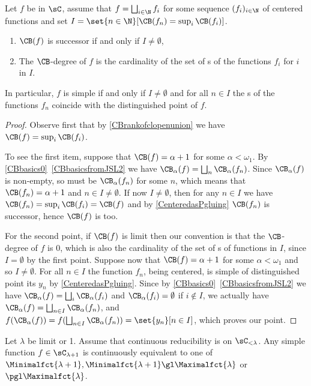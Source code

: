 \begin{proposition}\label{Simpleiffcoincidenceofcocenters}
Let $f$ be in $\sC$, assume that $f=\bigsqcup_{i\in\N} f_i$ for some sequence $(f_i)_{i\in\N}$ of centered functions and set $I=\set{n\in\N}[\CB(f_n)=\sup_i\CB(f_i)]$.
\begin{enumerate}
\item $\CB(f)$ is successor if and only if $I\neq\emptyset$,
\item The $\CB$-degree of $f$ is the cardinality of the set of \cocenter{}s of the functions $f_i$ for $i$ in $I$.
\end{enumerate}
In particular, $f$ is simple if and only if $I\neq\emptyset$ and for all $n\in I$ the \cocenter{}s of the functions $f_n$ coincide with the distinguished point of $f$.
\end{proposition}

\begin{proof}
Observe first that by \cref{CBrankofclopenunion} we have $\CB(f)=\sup_i\CB(f_i)$.

To see the first item, suppose that $\CB(f)=\alpha+1$ for some $\alpha<\omega_1$. By \cref{CBbasics0}~\cref{CBbasicsfromJSL2} we have $\CB_\alpha(f)=\bigsqcup_n\CB_\alpha(f_n)$.
Since $\CB_\alpha(f)$ is non-empty, so must be $\CB_\alpha(f_n)$ for some $n$, which means that $\CB(f_n)=\alpha+1$ and $n\in I\neq\emptyset$.
If now $I\neq\emptyset$, then for any $n\in I$ we have $\CB(f_n)=\sup_i\CB(f_i)=\CB(f)$ and by \cref{CenteredasPgluing} $\CB(f_n)$ is successor, hence $\CB(f)$ is too.

\smallskip

For the second point, if $\CB(f)$ is limit then our convention is that the $\CB$-degree of $f$ is $0$, which is also the cardinality of the set of \cocenter{}s of functions in $I$, since $I=\emptyset$ by the first point. Suppose now that $\CB(f)=\alpha+1$ for some $\alpha<\omega_1$ and so $I\neq\emptyset$.
For all $n\in I$ the function $f_n$, being centered, is simple of distinguished point its \cocenter{} $y_n$ by \cref{CenteredasPgluing}.
Since by \cref{CBbasics0}~\cref{CBbasicsfromJSL2} we have $\CB_\alpha(f)=\bigsqcup_i\CB_\alpha(f_i)$ and $\CB_{\alpha}(f_i)=\emptyset$ if $i\notin I$, we actually have
$\CB_\alpha(f)=\bigsqcup_{n\in I}\CB_\alpha(f_n)$, and $f(\CB_\alpha(f))=f(\bigsqcup_{n\in I}\CB_\alpha(f_n))=\set{y_n}[n\in I]$, which proves our point.
\end{proof}


\begin{theorem}\label{simplefunctionslambda+1damuddafuckaz}
Let $\lambda$ be limit or 1. Assume that continuous reducibility is \bqo{} on $\sC_{<\lambda}$.
Any simple function $f\in\sC_{\lambda+1}$ is continuously equivalent to one of $\Minimalfct{\lambda+1},\Minimalfct{\lambda+1}\gl\Maximalfct{\lambda}$ or $\pgl\Maximalfct{\lambda}$.
\end{theorem}

